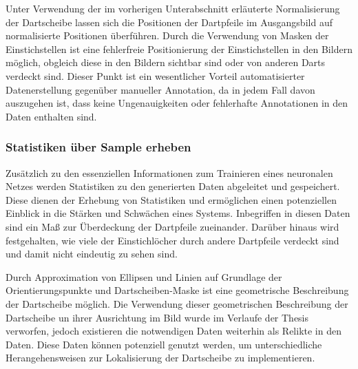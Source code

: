 Unter Verwendung der im vorherigen Unterabschnitt erläuterte Normalisierung der Dartscheibe lassen sich die Positionen der Dartpfeile im Ausgangsbild auf normalisierte Positionen überführen. Durch die Verwendung von Masken der Einstichstellen ist eine fehlerfreie Positionierung der Einstichstellen in den Bildern möglich, obgleich diese in den Bildern sichtbar sind oder von anderen Darts verdeckt sind. Dieser Punkt ist ein wesentlicher Vorteil automatisierter Datenerstellung gegenüber manueller Annotation, da in jedem Fall davon auszugehen ist, dass keine Ungenauigkeiten oder fehlerhafte Annotationen in den Daten enthalten sind.

\subsubsection{Statistiken über Sample erheben}

Zusätzlich zu den essenziellen Informationen zum Trainieren eines neuronalen Netzes werden Statistiken zu den generierten Daten abgeleitet und gespeichert. Diese dienen der Erhebung von Statistiken und ermöglichen einen potenziellen Einblick in die Stärken und Schwächen eines Systems. Inbegriffen in diesen Daten sind ein Maß zur Überdeckung der Dartpfeile zueinander. Darüber hinaus wird festgehalten, wie viele der Einstichlöcher durch andere Dartpfeile verdeckt sind und damit nicht eindeutig zu sehen sind.

Durch Approximation von Ellipsen und Linien auf Grundlage der Orientierungspunkte und Dartscheiben-Maske ist eine geometrische Beschreibung der Dartscheibe möglich. Die Verwendung dieser geometrischen Beschreibung der Dartscheibe un ihrer Ausrichtung im Bild wurde im Verlaufe der Thesis verworfen, jedoch existieren die notwendigen Daten weiterhin als Relikte in den Daten. Diese Daten können potenziell genutzt werden, um unterschiedliche Herangehensweisen zur Lokalisierung der Dartscheibe zu implementieren.


